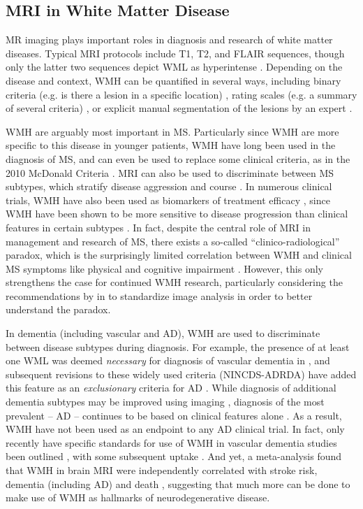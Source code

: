 \subsection{MRI in White Matter Disease}
MR imaging plays important roles in diagnosis and research of white matter diseases. Typical MRI protocols include T1, T2, and FLAIR sequences, though only the latter two sequences depict WML as hyperintense \cite{Simon2006,Wardlaw2013}. Depending on the disease and context, WMH can be quantified in several ways, including binary criteria (e.g. is there a lesion in a  specific location) \cite{Polman2011,Roman1993}, rating scales (e.g. a summary of several criteria) \cite{Fazekas1987}, or explicit manual segmentation of the lesions by an expert \cite{Egger2017}. 
\par
WMH are arguably most important in MS. Particularly since WMH are more specific to this disease in younger patients, WMH have long been used in the diagnosis of MS, and can even be used to replace some clinical criteria, as in the 2010 McDonald Criteria \cite{Polman2011}. MRI can also be used to discriminate between MS subtypes, which stratify disease aggression and course \cite{Polman2011,Lublin2014,Traboulsee2015}. In numerous clinical trials, WMH have also been used as biomarkers of treatment efficacy \cite{Sormani2013,Fahrbach2013,Ziemssen2015}, since WMH have been shown to be more sensitive to disease progression than clinical features in certain subtypes \cite{ORiordan1998}. In fact, despite the central role of MRI in management and research of MS, there exists a so-called ``clinico-radiological'' paradox, which is the surprisingly limited correlation between WMH and clinical MS symptoms like physical and cognitive impairment \cite{Mollison2017}. However, this only strengthens the case for continued WMH research, particularly considering the recommendations by \citeauthor{Mollison2017} in \cite{Mollison2017} to standardize image analysis in order to better understand the paradox.
\par
In dementia (including vascular and AD), WMH are used to discriminate between disease subtypes during diagnosis. For example, the presence of at least one WML was deemed \textit{necessary} for diagnosis of vascular dementia in \citeyear{Roman1993} \cite{Roman1993}, and subsequent revisions to these widely used criteria (NINCDS-ADRDA) have added this feature as an \textit{exclusionary} criteria for AD \cite{Dubois2007}. While diagnosis of additional dementia subtypes may be improved using imaging \cite{Sorbi2012,Verhagen2016}, diagnosis of the most prevalent -- AD -- continues to be based on clinical features alone \cite{McKhann2011}. As a result, WMH have not been used as an endpoint to any AD clinical trial. In fact, only recently have specific standards for use of WMH in vascular dementia studies been outlined \cite{Wardlaw2013,Wardlaw2015}, with some subsequent uptake \cite{VanWesten2016}. And yet, a \citeyear{Debette2010} meta-analysis found that WMH in brain MRI were independently correlated with stroke risk, dementia (including AD) and death \cite{Debette2010}, suggesting that much more can be done to make use of WMH as hallmarks of neurodegenerative disease.
